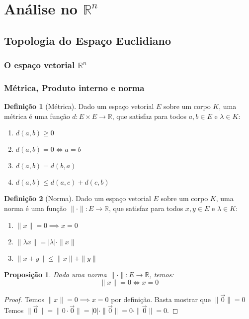 \documentclass{article}
\theoremstyle{plain}
\newtheorem{prop}{Proposição}[section]
\theoremstyle{definition}
\newtheorem{definicao}{Definição}[section]
\theoremstyle{remark}
\begin{document}
\section{Análise no $\mathbb{R}^n$}
\subsection{ Topologia do Espaço Euclidiano}
   \subsubsection{O espaço vetorial $\mathbb{R}^n$}
   \subsubsection{Métrica, Produto interno e norma}
\begin{definicao}[Métrica]
	Dado um espaço vetorial $E$ sobre um corpo $K$, uma métrica é uma função $d: E\times E \to \mathbb{R}$, que satisfaz para todos $a,b\in E$ e $\lambda \in K$:
	\begin{enumerate}
		\item $d(a,b) \geq 0$
		\item $d(a,b) = 0 \iff a = b $
		\item $d(a,b) = d(b,a)$
		\item $ d(a,b) \leq d(a,c) + d(c,b)$
	\end{enumerate}
\end{definicao}
\begin{definicao}[Norma]
	Dado um espaço vetorial $E$ sobre um corpo $K$, uma norma é uma função $\| \cdot \|: E \to \mathbb{R}$, que satisfaz para todos $x,y\in E$ e $\lambda \in K$:

	\begin{enumerate}
		\item $\| x \| = 0 \implies x = 0 $
		\item $\| \lambda x \| = | \lambda | \cdot \| x \|$
		\item $ \| x+y \| \leq \| x \| + \| y \|$
	\end{enumerate}
\end{definicao}
\begin{prop}
	Dada uma norma $\| \cdot \|: E \to \mathbb{R}$, temos:
	$$ \| x\| = 0 \iff x = 0 $$
\end{prop}
\begin{proof}
	Temos $\| x \| =0 \implies x = 0$ por definição. Basta mostrar que $\| \vec{0} \| = 0 $
	Temos $\| \vec{0} \| = \| 0 \cdot \vec{0} \|  = |0| \cdot \| \vec{0} \| = 0 \cdot \|\vec{0} \| = 0$.
\end{proof}
\end{document}
